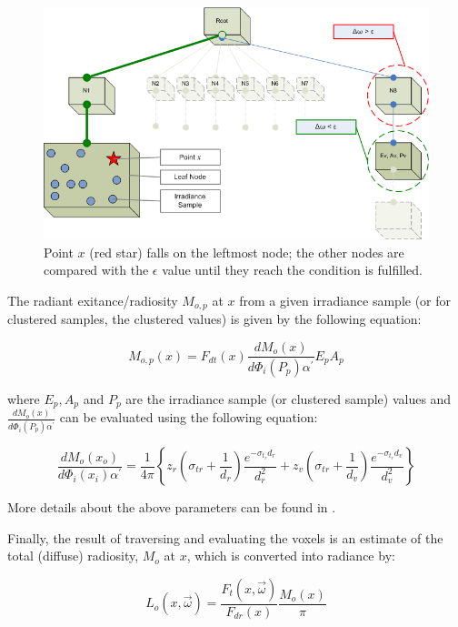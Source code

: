\documentclass{article}
\begin{document}
\begin{figure}[tbh]
\centering
\includegraphics[scale=0.5]{./Pictures/Octree.png}
\caption{Point $x$ (red star) falls on the leftmost node; the other nodes are compared with the $\epsilon$ value until they reach the condition is fulfilled.}
\label{Octree}
\end{figure}

The radiant exitance/radiosity $M_{o,p}$ at $x$ from a given irradiance sample (or for clustered samples, the clustered values) is given by the following equation:

\begin{equation}
M_{o,p}(x) = F_{dt}(x) \frac{dM_o(x)}{d\Phi _i(P_p)\alpha ^{\prime}} E_p A_p
\end{equation}

where $E_p, A_p$ and $P_p$ are the irradiance sample (or clustered sample) values and $\frac{dM_o(x)}{d\Phi _i(P_p)\alpha ^{\prime}}$ can be evaluated using the following equation:

\begin{equation}
\frac{dM_o(x_o)}{d\Phi _i(x_i)\alpha ^{\prime}} = \frac{1}{4\pi}
\left\{ 
z_r ( {\sigma}_{tr} + \frac{1}{d_r} ) \frac{e^{-{\sigma} _{t_r} d_r}}{d _r ^2} + 
z_v ( {\sigma}_{tr} + \frac{1}{d_v} ) \frac{e^{-{\sigma} _{t_r} d_v}}{d _v ^2}
\right\}
\end{equation}

More details about the above parameters can be found in \cite{HierarchicalSSS}.

Finally, the result of traversing and evaluating the voxels is an estimate of the total (diffuse) radiosity, $M_o$ at $x$, which is converted into radiance by:

\begin{equation}
L_o(x,\vec{\omega}) = \frac{F_t(x,\vec{\omega})}{F_{dr}(x)}\frac{M_o(x)}{\pi}
\end{equation}
\end{document}

